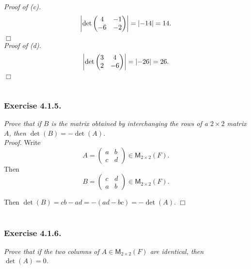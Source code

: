 \documentclass{article}
\begin{document}
\emph{Proof of (c).}
$$\abs{\det\begin{pmatrix} 4 & -1 \\ -6 & -2 \end{pmatrix}}
= \abs{-14} = 14.$$
$\Box$ \\

\emph{Proof of (d).}
$$\abs{\det\begin{pmatrix} 3 & 4 \\ 2 & -6 \end{pmatrix}}
= \abs{-26} = 26.$$
$\Box$ \\\\






\subsubsection*{Exercise 4.1.5.}
\emph{Prove that if $B$ is the matrix obtained by interchanging the rows
of a $2 \times 2$ matrix $A$,
then $\det(B) = -\det(A)$.} \\

\emph{Proof.}
Write
$$A =
\begin{pmatrix}
a & b \\
c & d
\end{pmatrix} \in \mathsf{M}_{2 \times 2}(F).$$
Then
$$B =
\begin{pmatrix}
c & d \\
a & b
\end{pmatrix} \in \mathsf{M}_{2 \times 2}(F).$$

Then $\det(B) = cb - ad = -(ad - bc) = -\det(A)$.
$\Box$ \\\\






\subsubsection*{Exercise 4.1.6.}
\emph{Prove that if the two columns of $A \in \mathsf{M}_{2 \times 2}(F)$
are identical, then $\det(A) = 0$.} \\
\end{document}
